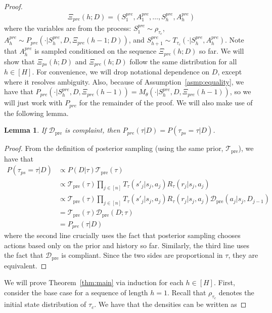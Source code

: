\documentclass{article}
\newcommand{\Dcal}{\mathcal{D}}
\newcommand{\Tcal}{{\mathcal{T}}}
\newcommand{\pretraind}{\Dcal_{\text{pre}}}
\newcommand{\pretraint}{\Tcal_{\text{pre}}}
\newtheorem{lemma}[claim]{Lemma}
\begin{document}
\begin{proof}
\begin{align}
    \Xi_{pre}(h; D) =  \left(S_1^{pre}, A_1^{pre}, \ldots, S_h^{pre}, A_h^{pre}\right)
\end{align}
where the variables are from the process: $S_1^{pre} \sim \rho_{\tau_c}$, $A_h^{pre} \sim P_{pre} (\cdot | S_h^{pre}, D, \Xi_{pre}(h - 1; D))$, and $S_{h + 1}^{pre} \sim T_{\tau_c}(\cdot | S_h^{pre}, A_h^{pre})$. Note that $A_h^{pre}$ is sampled conditioned on the sequence $\Xi_{pre}(h; D)$ so far.
We will show that $\Xi_{ps} (h; D)$ and $\Xi_{pre}(h; D)$ follow the same distribution for all $h \in [H]$. For  convenience, we will drop notational dependence on $D$, except where it resolves ambiguity. Also, because of Assumption~\ref{asmp:equality}, we have that $P_{pre}(\cdot | S^{pre}_h, D, \Xi_{pre}(h - 1)) = M_{\theta} (\cdot | S^{pre}_h, D, \Xi_{pre}(h - 1))$, so we will just work with $P_{pre}$ for the remainder of the proof. We will also make use of the following lemma.
\begin{lemma}\label{lem:compliance}
    If $\pretraind$ is complaint, then $P_{pre} (\tau | D) = P(\tau_{ps} = \tau | D)$.
\end{lemma}
\begin{proof}
From the definition of posterior sampling (using the same prior, $\pretraint$), we have that
    \begin{align}
            P(\tau_{ps}  = \tau | D) & \propto P(D | \tau) \pretraint(\tau) \\
            & \propto \pretraint(\tau) \prod_{j \in [n]} T_{\tau}(s'_j  | s_j, a_j) R_\tau(r_j | s_j, a_j)  \\
            & \propto \pretraint(\tau) \prod_{j \in [n]} T_{\tau}(s'_j  | s_j, a_j) R_\tau(r_j | s_j, a_j) \pretraind(a_j | s_j, D_{j - 1}) \\
            & = \pretraint(\tau) \pretraind(D; \tau) \\
            & = P_{pre}(\tau | D)
    \end{align}
where the second line crucially uses the fact that posterior sampling chooses actions based only on the prior and history so far. Similarly, the third line uses the fact that $\pretraind$ is compliant. Since the two sides are proportional in $\tau$, they are equivalent.
\end{proof}
We will prove Theorem~\ref{thm:main} via induction for each $h \in [H]$. First, consider the base case for a sequence of length $h = 1$. Recall that $\rho_{\tau_c}$ denotes the initial state distribution of $\tau_c$. We have that the densities can be written as

\end{proof}
\end{document}
